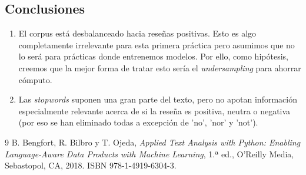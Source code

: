 \documentclass[10pt,a4paper]{article}
\begin{document}
\subsection{Conclusiones}

\begin{enumerate}
    \item El corpus está desbalanceado hacia reseñas positivas. Esto es algo completamente irrelevante para esta 
    primera práctica pero asumimos que no lo será para prácticas donde entrenemos modelos. Por ello, como hipótesis, 
    creemos que la mejor forma de tratar esto sería el \textit{undersampling} para ahorrar cómputo. 
    \item Las \textit{stopwords} suponen una gran parte del texto, pero no apotan información especialmente relevante 
    acerca de si la reseña es positiva, neutra o negativa (por eso se han eliminado todas a excepción de 'no', 'nor' y 
    'not'). 

\end{enumerate}

\newpage

\begin{thebibliography}{9}
B. Bengfort, R. Bilbro y T. Ojeda,
\textit{Applied Text Analysis with Python: Enabling Language-Aware Data Products with Machine Learning},
1.ª ed., O'Reilly Media, Sebastopol, CA, 2018. ISBN 978-1-4919-6304-3.

\end{thebibliography}
\end{document}
